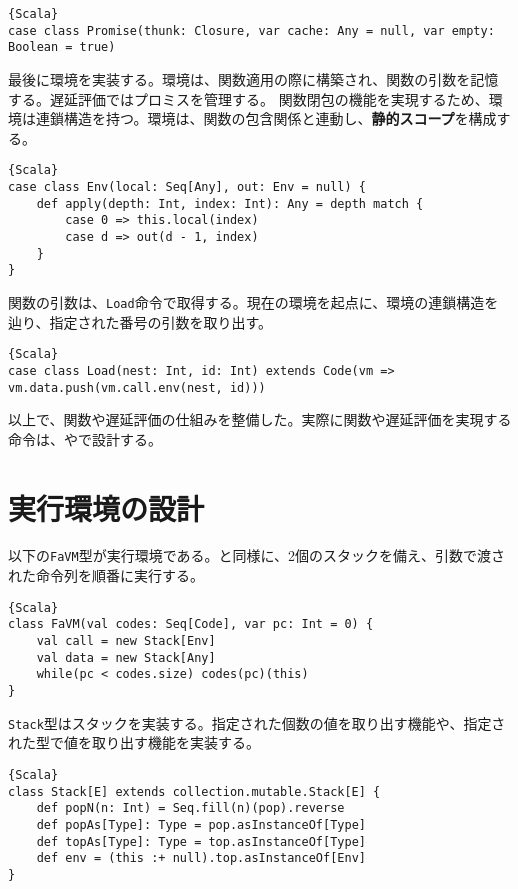 \documentclass[10pt,a4paper]{book}
\begin{document}
\begin{Verbatim}{Scala}
case class Promise(thunk: Closure, var cache: Any = null, var empty: Boolean = true)
\end{Verbatim}

最後に環境を実装する。環境は、関数適用の際に構築され、関数の引数を記憶する。遅延評価ではプロミスを管理する。
関数閉包の機能を実現するため、環境は連鎖構造を持つ。環境は、関数の包含関係と連動し、\textbf{静的スコープ}を構成する。

\begin{Verbatim}{Scala}
case class Env(local: Seq[Any], out: Env = null) {
	def apply(depth: Int, index: Int): Any = depth match {
		case 0 => this.local(index)
		case d => out(d - 1, index)
	}
}
\end{Verbatim}

関数の引数は、\texttt{Load}命令で取得する。現在の環境を起点に、環境の連鎖構造を辿り、指定された番号の引数を取り出す。

\begin{Verbatim}{Scala}
case class Load(nest: Int, id: Int) extends Code(vm => vm.data.push(vm.call.env(nest, id)))
\end{Verbatim}

以上で、関数や遅延評価の仕組みを整備した。実際に関数や遅延評価を実現する命令は、やで設計する。

\section{実行環境の設計}

以下の\texttt{FaVM}型が実行環境である。と同様に、2個のスタックを備え、引数で渡された命令列を順番に実行する。

\begin{Verbatim}{Scala}
class FaVM(val codes: Seq[Code], var pc: Int = 0) {
	val call = new Stack[Env]
	val data = new Stack[Any]
	while(pc < codes.size) codes(pc)(this)
}
\end{Verbatim}

\texttt{Stack}型はスタックを実装する。指定された個数の値を取り出す機能や、指定された型で値を取り出す機能を実装する。

\begin{Verbatim}{Scala}
class Stack[E] extends collection.mutable.Stack[E] {
	def popN(n: Int) = Seq.fill(n)(pop).reverse
	def popAs[Type]: Type = pop.asInstanceOf[Type]
	def topAs[Type]: Type = top.asInstanceOf[Type]
	def env = (this :+ null).top.asInstanceOf[Env]
}
\end{Verbatim}
\end{document}
